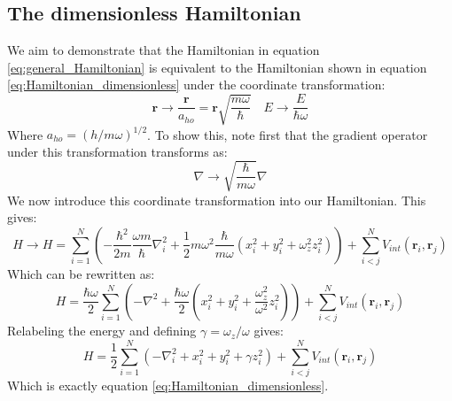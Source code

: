 \documentclass[a4paper, 10pt]{article}
\begin{document}
\begin{appendices}
		\section{The dimensionless Hamiltonian}\label{ap:dimensionless_hamiltonian}
		We aim to demonstrate that the Hamiltonian in equation \ref{eq:general_Hamiltonian} is equivalent to the Hamiltonian shown in equation \ref{eq:Hamiltonian_dimensionless} under the coordinate transformation:
		\begin{equation}
		\boldsymbol{r}\rightarrow \frac{\boldsymbol{r}}{a_{ho}}=\boldsymbol{r} \sqrt{\frac{m\omega}{\hbar}} \quad E\rightarrow \frac{E}{\hbar \omega}
		\end{equation}
		Where $a_{ho}=(h/m\omega)^{1/2}$. To show this, note first that the gradient operator under this transformation transforms as:
		\begin{equation}
		\nabla \rightarrow \sqrt{\frac{\hbar}{m\omega}} \nabla
		\end{equation}
		We now introduce this coordinate transformation into our Hamiltonian. This gives:
		\begin{equation}
		H\rightarrow H=\sum_{i=1}^{N}\left(-\frac{\hbar^2}{2m}\frac{\omega m}{\hbar}\nabla_i^2+\frac{1}{2}m\omega^2 \frac{\hbar}{m\omega}(x_i^2+y_i^2 +\omega_z^2 z_i^2) \right)+\sum_{i<j}^N V_{int}(\boldsymbol{r}_i, \boldsymbol{r}_j)
		\end{equation}
		Which can be rewritten as:
		\begin{equation}
		H=\frac{\hbar \omega}{2}\sum_{i=1}^N\left(-\nabla^2 +\frac{\hbar \omega}{2}\left(x_i^2+y_i^2 + \frac{\omega_z^2}{\omega^2}z_i^2\right)\right)+\sum_{i<j}^N V_{int}(\boldsymbol{r}_i, \boldsymbol{r}_j)
		\end{equation}
		Relabeling the energy and defining $\gamma=\omega_z/\omega$ gives:
		\begin{equation}
		H=\frac{1}{2}\sum_{i=1}^N \left(-\nabla_i^2 +x_i^2+y_i^2+\gamma z_i^2\right)+\sum_{i<j}^N V_{int}(\boldsymbol{r}_i, \boldsymbol{r}_j)
		\end{equation}
		Which is exactly equation \ref{eq:Hamiltonian_dimensionless}.
		

\end{appendices}
\end{document}

